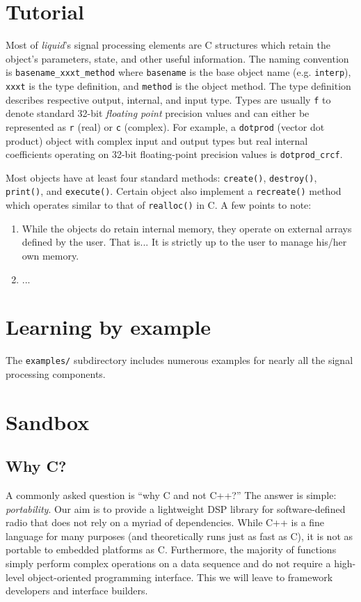 \documentclass[11pt,twoside]{report}
\begin{document}
\section{Tutorial}
Most of {\it liquid}'s signal processing elements are C structures which
retain the object's parameters, state, and other useful information.
The naming convention is
{\tt basename\_xxxt\_method} where
{\tt basename} is the base object name (e.g. {\tt interp}),
{\tt xxxt} is the type definition, and
{\tt method} is the object method.
The type definition describes respective output, internal, and input type.
Types are usually {\tt f} to denote standard 32-bit {\it floating point}
precision values and can either be represented as {\tt r} (real) or {\tt c}
(complex).
For example, a {\tt dotprod} (vector dot product) object with complex input
and output types but real internal coefficients operating on 32-bit
floating-point precision values is {\tt dotprod\_crcf}.

Most objects have at least four standard methods:
{\tt create()},
{\tt destroy()},
{\tt print()},
and
{\tt execute()}.
Certain object also implement a {\tt recreate()} method which operates similar
to that of {\tt realloc()} in C.
A few points to note:
\begin{enumerate}
\item While the objects do retain internal memory, they operate on external
arrays defined by the user. That is... It is strictly up to the user to manage
his/her own memory.
\item ...
\end{enumerate}

\section{Learning by example}
The {\tt examples/} subdirectory includes numerous examples for nearly all the
signal processing components.

\section{Sandbox}

\subsection{Why C?}
A commonly asked question is ``why C and not C++?''
The answer is simple: {\em portability}.
Our aim is to provide a lightweight DSP library for software-defined radio
that does not rely on a myriad of dependencies.
While C++ is a fine language for many purposes (and theoretically runs just as
fast as C), it is not as portable to embedded platforms as C.
Furthermore, the majority of functions simply perform complex operations on a
data sequence and do not require a high-level object-oriented programming
interface.
This we will leave to framework developers and interface builders.
\end{document}
